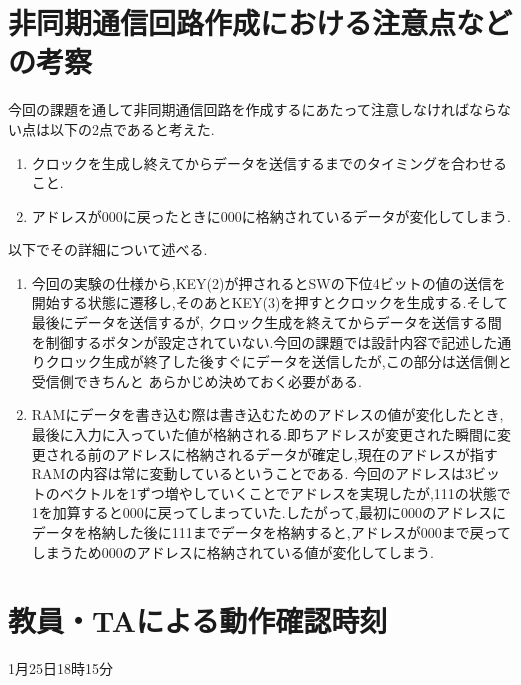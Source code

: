 \documentclass[dvipdfmx]{jarticle}
\begin{document}
\section{非同期通信回路作成における注意点などの考察}
今回の課題を通して非同期通信回路を作成するにあたって注意しなければならない点は以下の2点であると考えた.
\begin{enumerate}
  \item クロックを生成し終えてからデータを送信するまでのタイミングを合わせること.
  \item アドレスが000に戻ったときに000に格納されているデータが変化してしまう.
\end{enumerate}
以下でその詳細について述べる.
\begin{enumerate}
  \item 今回の実験の仕様から,KEY(2)が押されるとSWの下位4ビットの値の送信を開始する状態に遷移し,そのあとKEY(3)を押すとクロックを生成する.そして最後にデータを送信するが,
クロック生成を終えてからデータを送信する間を制御するボタンが設定されていない.今回の課題では設計内容で記述した通りクロック生成が終了した後すぐにデータを送信したが,この部分は送信側と受信側できちんと
あらかじめ決めておく必要がある.
  \item RAMにデータを書き込む際は書き込むためのアドレスの値が変化したとき,最後に入力に入っていた値が格納される.即ちアドレスが変更された瞬間に変更される前のアドレスに格納されるデータが確定し,現在のアドレスが指すRAMの内容は常に変動しているということである.
今回のアドレスは3ビットのベクトルを1ずつ増やしていくことでアドレスを実現したが,111の状態で1を加算すると000に戻ってしまっていた.したがって,最初に000のアドレスにデータを格納した後に111までデータを格納すると,アドレスが000まで戻ってしまうため000のアドレスに格納されている値が変化してしまう.
\end{enumerate}
\section{教員・TAによる動作確認時刻}
1月25日18時15分
\end{document}
